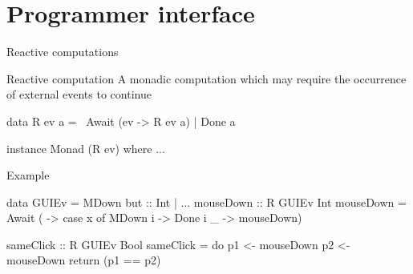 \documentclass{beamer}
\begin{document}
\section{Programmer interface}

\begin{frame}{Reactive computations}

\begin{block}{Reactive computation}
A monadic computation which may require the occurrence of external events to continue
\end{block}
\vspace{-0.3cm}
\begin{code}
data R ev a =~ Await (ev -> R ev a) | Done a

instance Monad (R ev) where ...
\end{code}
\vspace{-0.6cm}
\pause
\begin{block}{Example}
\vspace{-0.4cm}
\begin{code}
data GUIEv  =  MDown { but :: Int} |  ...
mouseDown :: R GUIEv Int
mouseDown = Await ( \x -> case x of  MDown i  -> Done i
                                     _  -> mouseDown)

sameClick :: R GUIEv Bool
sameClick = do  p1 <- mouseDown
                p2 <- mouseDown
                return (p1 == p2)
\end{code}
\vspace{-0.6cm}
\end{block}
\end{frame}
\end{document}
